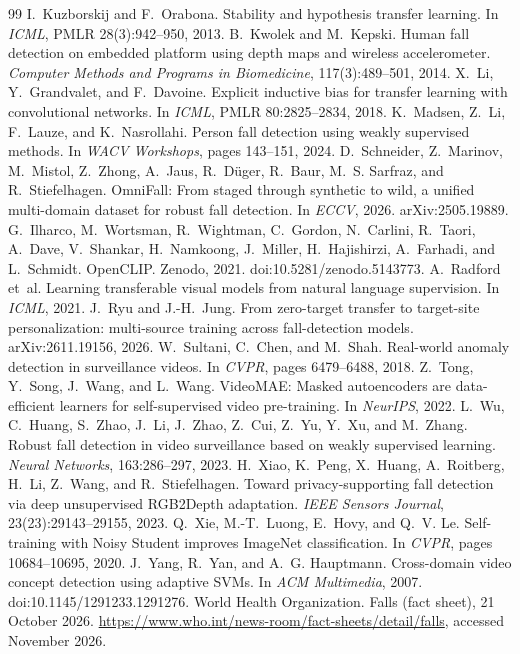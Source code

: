 \documentclass[10pt,twocolumn,letterpaper]{article}
\begin{document}
\begin{thebibliography}{99}
 I.~Kuzborskij and F.~Orabona. Stability and hypothesis transfer learning. In \emph{ICML}, PMLR 28(3):942--950, 2013.
 B.~Kwolek and M.~Kepski. Human fall detection on embedded platform using depth maps and wireless accelerometer. \emph{Computer Methods and Programs in Biomedicine}, 117(3):489--501, 2014.
 X.~Li, Y.~Grandvalet, and F.~Davoine. Explicit inductive bias for transfer learning with convolutional networks. In \emph{ICML}, PMLR 80:2825--2834, 2018.
 K.~Madsen, Z.~Li, F.~Lauze, and K.~Nasrollahi. Person fall detection using weakly supervised methods. In \emph{WACV Workshops}, pages 143--151, 2024.
 D.~Schneider, Z.~Marinov, M.~Mistol, Z.~Zhong, A.~Jaus, R.~D\"uger, R.~Baur, M.~S. Sarfraz, and R.~Stiefelhagen. OmniFall: From staged through synthetic to wild, a unified multi-domain dataset for robust fall detection. In \emph{ECCV}, 2026. arXiv:2505.19889.
 G.~Ilharco, M.~Wortsman, R.~Wightman, C.~Gordon, N.~Carlini, R.~Taori, A.~Dave, V.~Shankar, H.~Namkoong, J.~Miller, H.~Hajishirzi, A.~Farhadi, and L.~Schmidt. OpenCLIP. Zenodo, 2021. doi:10.5281/zenodo.5143773.
 A.~Radford et~al. Learning transferable visual models from natural language supervision. In \emph{ICML}, 2021.
 J.~Ryu and J.-H.~Jung. From zero-target transfer to target-site personalization: multi-source training across fall-detection models. arXiv:2611.19156, 2026.
 W.~Sultani, C.~Chen, and M.~Shah. Real-world anomaly detection in surveillance videos. In \emph{CVPR}, pages 6479--6488, 2018.
 Z.~Tong, Y.~Song, J.~Wang, and L.~Wang. VideoMAE: Masked autoencoders are data-efficient learners for self-supervised video pre-training. In \emph{NeurIPS}, 2022.
 L.~Wu, C.~Huang, S.~Zhao, J.~Li, J.~Zhao, Z.~Cui, Z.~Yu, Y.~Xu, and M.~Zhang. Robust fall detection in video surveillance based on weakly supervised learning. \emph{Neural Networks}, 163:286--297, 2023.
 H.~Xiao, K.~Peng, X.~Huang, A.~Roitberg, H.~Li, Z.~Wang, and R.~Stiefelhagen. Toward privacy-supporting fall detection via deep unsupervised RGB2Depth adaptation. \emph{IEEE Sensors Journal}, 23(23):29143--29155, 2023.
 Q.~Xie, M.-T.~Luong, E.~Hovy, and Q.~V. Le. Self-training with Noisy Student improves ImageNet classification. In \emph{CVPR}, pages 10684--10695, 2020.
 J.~Yang, R.~Yan, and A.~G. Hauptmann. Cross-domain video concept detection using adaptive SVMs. In \emph{ACM Multimedia}, 2007. doi:10.1145/1291233.1291276.
 World Health Organization. Falls (fact sheet), 21 October 2026. \url{https://www.who.int/news-room/fact-sheets/detail/falls}, accessed November 2026.
\end{thebibliography}
\end{document}
